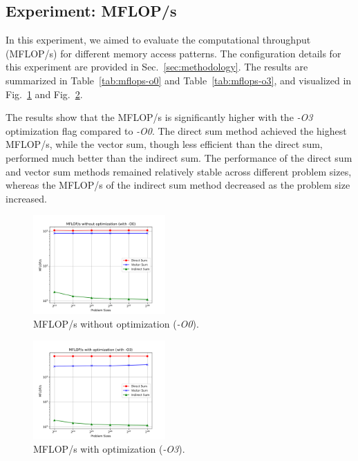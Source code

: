 \subsection{Experiment: MFLOP/s}


In this experiment, we aimed to evaluate the computational throughput (MFLOP/s) for different memory access patterns. The configuration details for this experiment are provided in Sec.~\ref{sec:methodology}. The results are summarized in Table~\ref{tab:mflops-o0} and Table~\ref{tab:mflops-o3}, and visualized in Fig.~\ref{fig:MFLOPs_O0} and Fig.~\ref{fig:MFLOPs_O3}.

The results show that the MFLOP/s is significantly higher with the \textit{-O3} optimization flag compared to \textit{-O0}. The direct sum method achieved the highest MFLOP/s, while the vector sum, though less efficient than the direct sum, performed much better than the indirect sum. The performance of the direct sum and vector sum methods remained relatively stable across different problem sizes, whereas the MFLOP/s of the indirect sum method decreased as the problem size increased.

\begin{figure}[htbp]
    \centering
    \includegraphics[width=0.45\textwidth]{MFLOPs_O0.png}
    \caption{MFLOP/s without optimization (\textit{-O0}).}
    \label{fig:MFLOPs_O0}
\end{figure}

\begin{figure}[htbp]
    \centering
    \includegraphics[width=0.45\textwidth]{MFLOPs_O3.png}
    \caption{MFLOP/s with optimization (\textit{-O3}).}
    \label{fig:MFLOPs_O3}
\end{figure}

